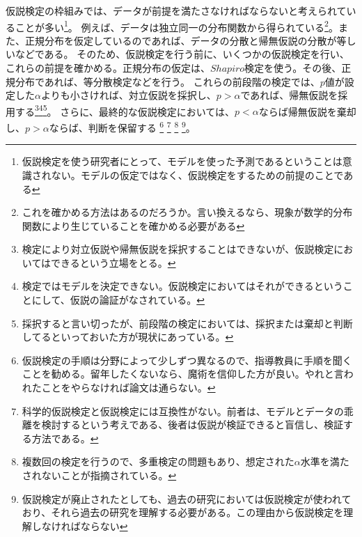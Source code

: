 仮説検定の枠組みでは、データが前提を満たさなければならないと考えられていることが多い\footnote{仮説検定を使う研究者にとって、モデルを使った予測であるということは意識されない。モデルの仮定ではなく、仮説検定をするための前提のことである}。
例えば、データは独立同一の分布関数から得られている\footnote{これを確かめる方法はあるのだろうか。言い換えるなら、現象が数学的分布関数により生じていることを確かめる必要がある}。また、正規分布を仮定しているのであれば、データの分散と帰無仮説の分散が等しいなどである。
そのため、仮説検定を行う前に、いくつかの仮説検定を行い、これらの前提を確かめる。正規分布の仮定は、$Shapiro$検定を使う。その後、正規分布であれば、等分散検定などを行う。
これらの前段階の検定では、$p$値が設定した$\alpha$よりも小さければ、対立仮説を採択し、$p>\alpha$であれば、帰無仮説を採用する\footnote{検定により対立仮説や帰無仮説を採択することはできないが、仮説検定においてはできるという立場をとる。}\footnote{検定ではモデルを決定できない。仮説検定においてはそれができるということにして、仮説の論証がなされている。}\footnote{採択すると言い切ったが、前段階の検定においては、採択または棄却と判断してるといっておいた方が現状にあっている。}。
さらに、最終的な仮説検定においては、$p<\alpha$ならば帰無仮説を棄却し、$p>\alpha$ならば、判断を保留する
\footnote{仮説検定の手順は分野によって少しずつ異なるので、指導教員に手順を聞くことを勧める。留年したくないなら、魔術を信仰した方が良い。やれと言われたことをやらなければ論文は通らない。}
\footnote{科学的仮説検定と仮説検定には互換性がない。前者は、モデルとデータの乖離を検討するという考えである、後者は仮説が検証できると盲信し、検証する方法である。}
\footnote{複数回の検定を行うので、多重検定の問題もあり、想定された$\alpha$水準を満たされないことが指摘されている。}
\footnote{仮説検定が廃止されたとしても、過去の研究においては仮説検定が使われており、それら過去の研究を理解する必要がある。この理由から仮説検定を理解しなければならない}。



